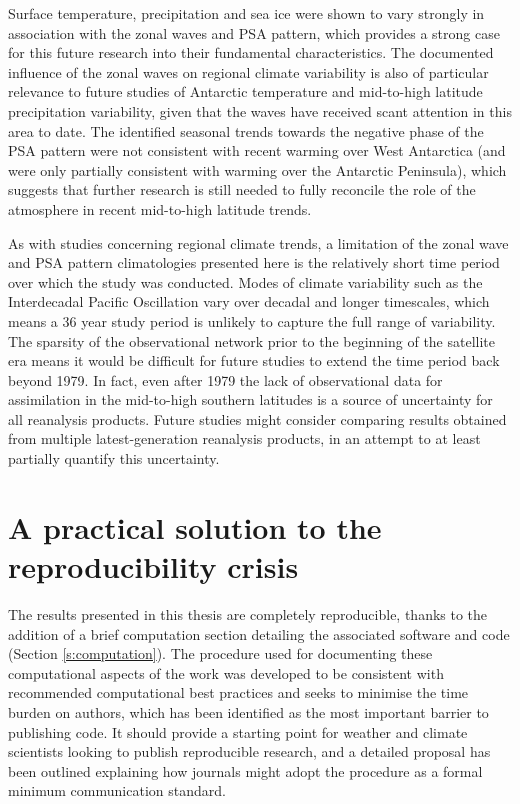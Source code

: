 Surface temperature, precipitation and sea ice were shown to vary strongly in association with the zonal waves and PSA pattern, which provides a strong case for this future research into their fundamental characteristics. The documented influence of the zonal waves on regional climate variability is also of particular relevance to future studies of Antarctic temperature and mid-to-high latitude precipitation variability, given that the waves have received scant attention in this area to date. The identified seasonal trends towards the negative phase of the PSA pattern were not consistent with recent warming over West Antarctica (and were only partially consistent with warming over the Antarctic Peninsula), which suggests that further research is still needed to fully reconcile the role of the atmosphere in recent mid-to-high latitude trends. 

As with studies concerning regional climate trends, a limitation of the zonal wave and PSA pattern climatologies presented here is the relatively short time period over which the study was conducted. Modes of climate variability such as the Interdecadal Pacific Oscillation \citep{Power1999} vary over decadal and longer timescales, which means a 36 year study period is unlikely to capture the full range of variability. The sparsity of the observational network prior to the beginning of the satellite era means it would be difficult for future studies to extend the time period back beyond 1979. In fact, even after 1979 the lack of observational data for assimilation in the mid-to-high southern latitudes is a source of uncertainty for all reanalysis products. Future studies might consider comparing results obtained from multiple latest-generation reanalysis products, in an attempt to at least partially quantify this uncertainty. 


\section{A practical solution to the reproducibility crisis}

The results presented in this thesis are completely reproducible, thanks to the addition of a brief computation section detailing the associated software and code (Section \ref{s:computation}). The procedure used for documenting these computational aspects of the work was developed to be consistent with recommended computational best practices and seeks to minimise the time burden on authors, which has been identified as the most important barrier to publishing code. It should provide a starting point for weather and climate scientists looking to publish reproducible research, and a detailed proposal has been outlined explaining how journals might adopt the procedure as a formal minimum communication standard.

